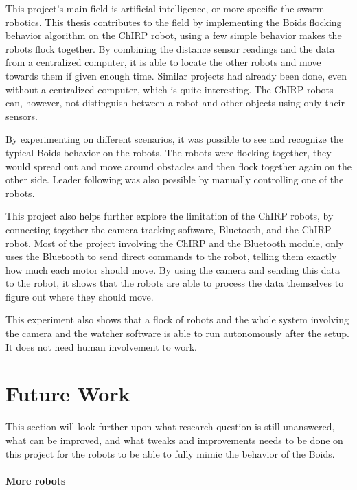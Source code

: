 This project's main field is artificial intelligence, or more specific the swarm robotics. This thesis contributes to the field by implementing the Boids flocking behavior algorithm on the ChIRP robot, using a few simple behavior makes the robots flock together. By combining the distance sensor readings and the data from a centralized computer, it is able to locate the other robots and move towards them if given enough time. Similar projects had already been done, even without a centralized computer, which is quite interesting. The ChIRP robots can, however, not distinguish between a robot and other objects using only their sensors.

By experimenting on different scenarios, it was possible to see and recognize the typical Boids behavior on the robots. The robots were flocking together, they would spread out and move around obstacles and then flock together again on the other side. Leader following was also possible by manually controlling one of the robots.

This project also helps further explore the limitation of the ChIRP robots, by connecting together the camera tracking software, Bluetooth, and the ChIRP robot.
Most of the project involving the ChIRP and the Bluetooth module, only uses the Bluetooth to send direct commands to the robot, telling them exactly how much each motor should move. By using the camera and sending this data to the robot, it shows that the robots are able to process the data themselves to figure out where they should move.

This experiment also shows that a flock of robots and the whole system involving the camera and the watcher software is able to run autonomously after the setup. It does not need human involvement to work.






\section{Future Work}
\label{sec:futureWork}

This section will look further upon what research question is still unanswered, what can be improved, and what tweaks and improvements needs to be done on this project for the robots to be able to fully mimic the behavior of the Boids. \\\\
\textbf{More robots}

